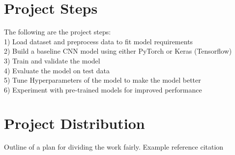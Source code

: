 \documentclass[11pt]{article}
\begin{document}
\section{Project Steps}
The following are the project steps: \\
1) Load dataset and preprocess data to fit model requirements \\
2) Build a baseline CNN model using either PyTorch or Keras (Tensorflow) \\
3) Train and validate the model \\
4) Evaluate the model on test data \\
5) Tune Hyperparameters of the model to make the model better \\
6) Experiment with pre-trained models for improved performance \\

\section{Project Distribution}
Outline of a plan for dividing the work fairly.
Example reference citation \cite{bishop2006pattern}



\end{document}
